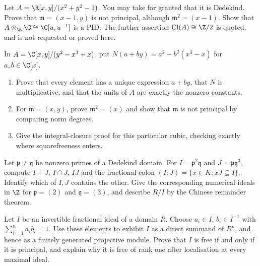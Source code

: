 \begin{exercise}[$\star\star$]\label{ex:circle}
Let $A=\R[x,y]/(x^2+y^2-1)$. You may take for granted that it is Dedekind. Prove that $\mathfrak m=(x-1,y)$ is not principal, although $\mathfrak m^2=(x-1)$. Show that $A\otimes_{\R}\C\cong\C[u,u^{-1}]$ is a PID. The further assertion $\operatorname{Cl}(A)\cong\Z/2$ is quoted, and is not requested or proved here.
\end{exercise}

\begin{exercise}[$\star\star\star$]\label{ex:cubicnotprincipal}
In $A=\C[x,y]/(y^2-x^3+x)$, put $N(a+by)=a^2-b^2(x^3-x)$ for $a,b\in\C[x]$.
\begin{enumerate}[label=(\alph*)]
\item Prove that every element has a unique expression $a+by$, that $N$ is multiplicative, and that the units of $A$ are exactly the nonzero constants.
\item For $\mathfrak m=(x,y)$, prove $\mathfrak m^2=(x)$ and show that $\mathfrak m$ is not principal by comparing norm degrees.
\item Give the integral-closure proof for this particular cubic, checking exactly where squarefreeness enters.
\end{enumerate}
\end{exercise}

\begin{exercise}[$\star\star$]\label{ex:v10new-ch06-arithmetic}
Let $\mathfrak p\ne\mathfrak q$ be nonzero primes of a Dedekind domain. For $I=\mathfrak p^2\mathfrak q$ and $J=\mathfrak p\mathfrak q^3$, compute $I+J$, $I\cap J$, $IJ$ and the fractional colon $(I:J)=\{x\in K:xJ\subseteq I\}$. Identify which of $I,J$ contains the other. Give the corresponding numerical ideals in $\Z$ for $\mathfrak p=(2)$ and $\mathfrak q=(3)$, and describe $R/I$ by the Chinese remainder theorem.
\end{exercise}

\begin{exercise}[$\star\star$]\label{ex:v10new-ch06-projective}
Let $I$ be an invertible fractional ideal of a domain $R$. Choose $a_i\in I$, $b_i\in I^{-1}$ with $\sum_{i=1}^n a_ib_i=1$. Use these elements to exhibit $I$ as a direct summand of $R^n$, and hence as a finitely generated projective module. Prove that $I$ is free if and only if it is principal, and explain why it is free of rank one after localisation at every maximal ideal.
\end{exercise}


